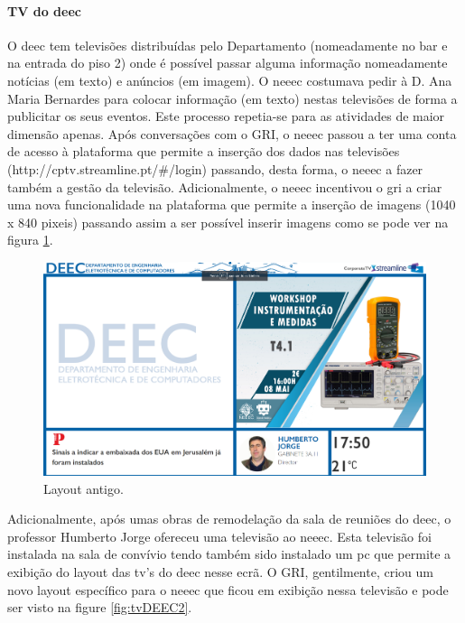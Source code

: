 
\paragraph{TV do \acrshort{deec}}

O \acrshort{deec} tem televisões distribuídas pelo Departamento (nomeadamente no bar e na entrada do piso 2) onde é possível passar alguma informação nomeadamente notícias (em texto) e anúncios (em imagem). O \acrshort{neeec} costumava pedir à D. Ana Maria Bernardes para colocar informação (em texto) nestas televisões de forma a publicitar os seus eventos. Este processo repetia-se para as atividades de maior dimensão apenas. Após conversações com o GRI, o \acrshort{neeec} passou a ter uma conta de acesso à plataforma que permite a inserção dos dados nas televisões (http://cptv.streamline.pt/\#/login) passando, desta forma, o \acrshort{neeec} a fazer também a gestão da televisão. Adicionalmente, o \acrshort{neeec} incentivou o \acrshort{gri} a criar uma nova funcionalidade na plataforma que permite a inserção de imagens (1040 x 840 pixeis) passando assim a ser possível inserir imagens como se pode ver na figura \ref{fig:tvDEEC1}.

\begin{figure}[ht]
\centering
\includegraphics[width=\textwidth]{imagens/tvDEEC1.png}
\caption{Layout antigo.}
\label{fig:tvDEEC1}
\end{figure}

Adicionalmente, após umas obras de remodelação da sala de reuniões do \acrshort{deec}, o professor Humberto Jorge ofereceu uma televisão ao \acrshort{neeec}. Esta televisão foi instalada na sala de convívio tendo também sido instalado um pc que permite a exibição do layout das tv’s do \acrshort{deec} nesse ecrã. O GRI, gentilmente, criou um novo layout específico para o \acrshort{neeec} que ficou em exibição nessa televisão e pode ser visto na figure \ref{fig:tvDEEC2}.

